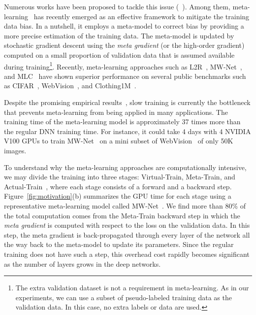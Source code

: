 \documentclass[final]{cvpr}
\begin{document}
Numerous works have been proposed to tackle this issue (\eg~\cite{jiang2017mentornet, han2018co, ren2018learning, li2020dividemix, lin2017focal}). Among them, meta-learning~\cite{ren2018learning, shu2019meta, wang2020training} has recently emerged as an effective framework to mitigate the training data bias. In a nutshell, it employs a meta-model to correct bias by providing a more precise estimation of the training data. The meta-model is updated by stochastic gradient descent using the \emph{meta gradient} (or the high-order gradient) computed on a small proportion of validation data that is assumed available during training\footnote{The extra validation dataset is not a requirement in meta-learning. As in our experiments, we can use a subset of pseudo-labeled training data as the validation data. In this case, no extra labels or data are used.}.
Recently, meta-learning approaches such as L2R~\cite{ren2018learning}, MW-Net~\cite{shu2019meta}, and MLC~\cite{wang2020training} have shown superior performance on several public benchmarks such as CIFAR~\cite{krizhevsky2009learning}, WebVision~\cite{li2017webvision}, and Clothing1M~\cite{xiao2015learning}.

Despite the promising empirical results~\cite{vyas2020learning,shu2020meta}, slow training is currently the bottleneck that prevents meta-learning from being applied in many applications.
The training time of the meta-learning model is approximately 37 times more than the regular DNN training time. For instance, it could take 4 days with 4 NVIDIA V100 GPUs to train MW-Net~\cite{shu2019meta} on a mini subset of WebVision~\cite{li2017webvision,jiang2017mentornet} of only 50K images.


To understand why the meta-learning approaches are computationally intensive,
we may divide the training into three stages: Virtual-Train, Meta-Train, and Actual-Train~\cite{wang2020training}, where each stage consists of a forward and a backward step. Figure~\ref{fig:motivation}(b) summarizes the GPU time for each stage using a representative meta-learning model called MW-Net~\cite{shu2019meta}. We find more than 80\% of the total computation comes from the Meta-Train backward step in which the \emph{meta gradient} is computed with respect to the loss on the validation data. In this step, the meta gradient is back-propagated through every layer of the network all the way back to the meta-model to update its parameters. Since the regular training does not have such a step, this overhead cost rapidly becomes significant as the number of layers grows in the deep networks.
\end{document}
